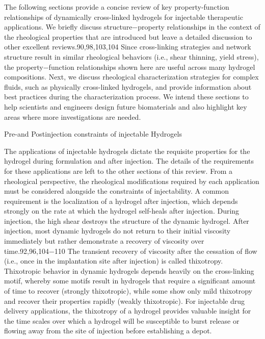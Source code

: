 \documentclass[../../main-notes.tex]{subfiles}
\begin{document}
The following sections provide a concise review of key property-function relationships of dynamically cross-linked hydrogels for injectable therapeutic applications. 
We briefly discuss structure−property relationships in the context of the rheological properties that are introduced but leave a detailed discussion to  other excellent reviews.90,98,103,104 
Since cross-linking strategies and network structure result in similar rheological behaviors (i.e., shear thinning, yield stress), the property−function relationships shown here are useful across many hydrogel compositions. 
Next, we discuss rheological characterization strategies for complex fluids, such as physically cross-linked hydrogels, and provide information about best practices during the characterization process. 
We intend these sections to help scientists and engineers design future biomaterials and also highlight key areas where more investigations are needed.


Pre-and Postinjection constraints of injectable Hydrogels 

The applications of injectable hydrogels dictate the requisite properties for the hydrogel during formulation and after injection.  
The details of the requirements for these applications are left to the other sections of this review.  
From a rheological perspective, the rheological modifications required by each application must be considered alongside the constraints of injectability.  
A common requirement is the localization of a hydrogel after injection, which depends strongly on the rate at which the hydrogel self-heals after injection.  
During injection, the high shear destroys the structure of the dynamic hydrogel.  
After injection, most dynamic hydrogels do not return to their initial viscosity immediately but rather demonstrate a recovery  of viscosity over time.92,96,104−110  
The transient recovery of viscosity after the cessation of flow (i.e., once in the implantation site after injection) is called thixotropy.  
Thixotropic behavior in dynamic hydrogels depends heavily on the cross-linking motif, whereby some motifs result in hydrogels that require a significant amount of time to recover (strongly thixotropic), while some show only mild thixotropy and recover their properties rapidly (weakly thixotropic).  
For injectable drug delivery applications, the thixotropy of a hydrogel provides valuable insight for the time scales over which a hydrogel will be susceptible to burst release or flowing away from the site of injection before establishing a depot.
\end{document}
